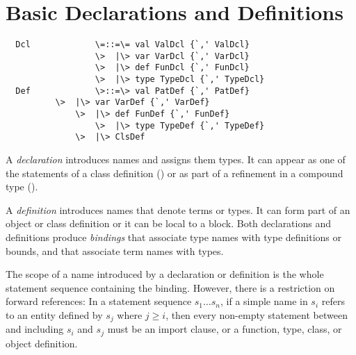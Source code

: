 \documentclass[11pt]{report}
\begin{document}
\chapter{Basic Declarations and Definitions}
\label{sec:defs}

\syntax\begin{verbatim}
  Dcl             \=::=\= val ValDcl {`,' ValDcl}
                  \>  |\> var VarDcl {`,' VarDcl}
                  \>  |\> def FunDcl {`,' FunDcl}
                  \>  |\> type TypeDcl {`,' TypeDcl}
  Def             \>::=\> val PatDef {`,' PatDef}
		  \>  |\> var VarDef {`,' VarDef}
  	          \>  |\> def FunDef {`,' FunDef}
                  \>  |\> type TypeDef {`,' TypeDef}
	          \>  |\> ClsDef
\end{verbatim}

A {\em declaration} introduces names and assigns them types. It can
appear as one of the statements of a class definition
() or as part of a refinement in a compound
type ().

A {\em definition} introduces names that denote terms or types. It can
form part of an object or class definition or it can be local to a
block.  Both declarations and definitions produce {\em bindings} that
associate type names with type definitions or bounds, and that
associate term names with types.

The scope of a name introduced by a declaration or definition is the
whole statement sequence containing the binding.  However, there is a
restriction on forward references: In a statement sequence $s_1 \ldots
s_n$, if a simple name in $s_i$ refers to an entity defined by $s_j$
where $j \geq i$, then every non-empty statement between and including
$s_i$ and $s_j$ must be an import clause,
or a function, type, class, or object definition.

\end{document}
